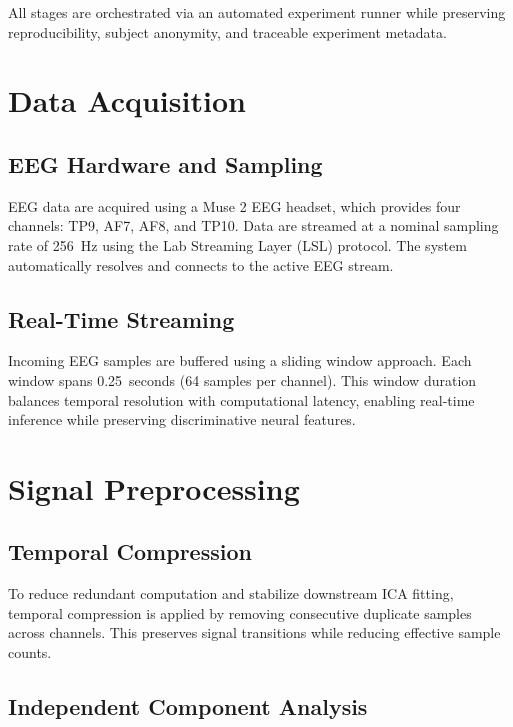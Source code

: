 \documentclass[11pt]{article}
\begin{document}
All stages are orchestrated via an automated experiment runner while preserving reproducibility, subject anonymity, and traceable experiment metadata.

\section{Data Acquisition}

\subsection{EEG Hardware and Sampling}

EEG data are acquired using a Muse 2 EEG headset, which provides four channels: TP9, AF7, AF8, and TP10. Data are streamed at a nominal sampling rate of 256~Hz using the Lab Streaming Layer (LSL) protocol. The system automatically resolves and connects to the active EEG stream.

\subsection{Real-Time Streaming}

Incoming EEG samples are buffered using a sliding window approach. Each window spans 0.25~seconds (64 samples per channel). This window duration balances temporal resolution with computational latency, enabling real-time inference while preserving discriminative neural features.

\section{Signal Preprocessing}

\subsection{Temporal Compression}

To reduce redundant computation and stabilize downstream ICA fitting, temporal compression is applied by removing consecutive duplicate samples across channels. This preserves signal transitions while reducing effective sample counts.

\subsection{Independent Component Analysis}
\end{document}

